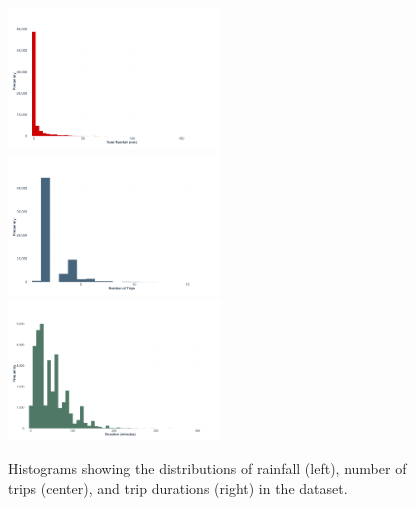\begin{figure}[H]
    \centering
    \includegraphics[width=0.5\textwidth]{../figures/rainfall_histogram.png}
    \includegraphics[width=0.5\textwidth]{../figures/trips_histogram.png}
    \includegraphics[width=0.5\textwidth]{../figures/duration_histogram.png}
    \caption{Histograms showing the distributions of rainfall (left), number of trips (center), and trip durations (right) in the dataset.}
    \label{fig:hist}
\end{figure}

